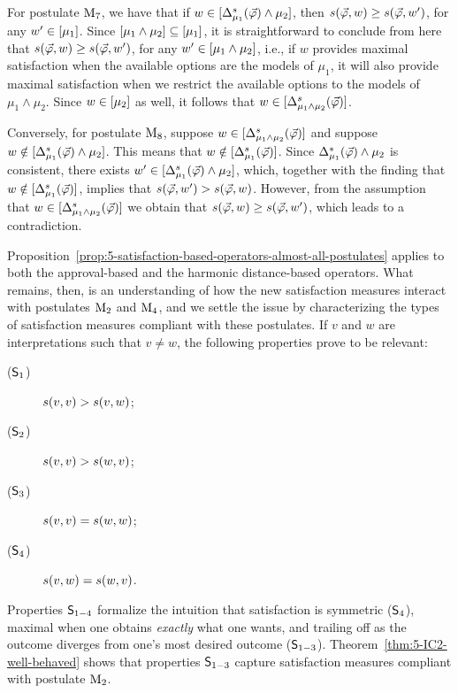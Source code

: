 \begin{prf*}{}{}
	For postulate $\mathrm{M}_{7}$, we have that if $w\in[\Delta^{s}_{\mu_1}({\vec{\varphi}})\land\mu_2]$,
	then $s({\vec{\varphi}},w)\geq s({\vec{\varphi}},w')$, for any $w'\in[\mu_1]$. 
	Since $[\mu_1\land\mu_2]\subseteq[\mu_1]$, it is straightforward
	to conclude from here that $s({\vec{\varphi}},w)\geq s({\vec{\varphi}},w')$, for any $w'\in[\mu_1\land\mu_2]$,
	i.e., if $w$ provides maximal satisfaction when the available options are the models of $\mu_1$,
	it will also provide maximal satisfaction when we restrict the available options to 
	the models of $\mu_1\land\mu_2$.
	Since $w\in[\mu_2]$ as well, it follows that $w\in[\Delta^{s}_{\mu_1\land\mu_2}({\vec{\varphi}})]$.
	
	Conversely, for postulate $\mathrm{M}_{8}$, suppose $w\in[\Delta^{s}_{\mu_1\land\mu_2}({\vec{\varphi}})]$
	and suppose $w\notin[\Delta^{s}_{\mu_1}({\vec{\varphi}})\land\mu_2]$.
	This means that $w\notin[\Delta^{s}_{\mu_1}({\vec{\varphi}})]$.
	Since $\Delta^{s}_{\mu_1}({\vec{\varphi}})\land\mu_2$ is consistent, there exists
	$w'\in[\Delta^{s}_{\mu_1}({\vec{\varphi}})\land\mu_2]$,
	which, together with the finding that $w\notin[\Delta^{s}_{\mu_1}({\vec{\varphi}})]$,
	implies that $s({\vec{\varphi}},w')>s({\vec{\varphi}},w)$.
	However, from the assumption that $w\in[\Delta^{s}_{\mu_1\land\mu_2}({\vec{\varphi}})]$
	we obtain that $s({\vec{\varphi}},w)\geq s({\vec{\varphi}},w')$,
	which leads to a contradiction.
\end{prf*}

Proposition~\ref{prop:5-satisfaction-based-operators-almost-all-postulates}
applies to both the approval-based and the harmonic distance-based operators.
What remains, then, is an understanding of how the new satisfaction measures
interact with postulates $\mathrm{M}_{2}$ and $\mathrm{M}_{4}$,
and we settle the issue by characterizing the types of satisfaction measures compliant
with these postulates.
If 
$v$ and $w$ are interpretations such that 
$v\neq w$,
the following properties 
prove to be relevant:

\begin{description}
	\item[($\mathsf{S}_{1}$)] $s(v,v)>s(v,w)$;
	\item[($\mathsf{S}_{2}$)] $s(v,v)>s(w,v)$;
	\item[($\mathsf{S}_{3}$)] $s(v,v)=s(w,w)$;
	\item[($\mathsf{S}_{4}$)] $s(v,w)=s(w,v)$.
\end{description}

Properties $\mathsf{S}_{1-4}$ formalize the intuition that satisfaction is symmetric ($\mathsf{S}_{4}$), 
maximal when one obtains \emph{exactly} what one wants,
and trailing off as the outcome diverges from one's most desired outcome ($\mathsf{S}_{1-3}$).
Theorem~\ref{thm:5-IC2-well-behaved} shows that 
properties $\mathsf{S}_{1-3}$
capture satisfaction measures 
compliant with postulate $\mathrm{M}_{2}$.

